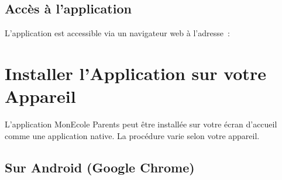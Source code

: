 \documentclass[12pt,a4paper]{report}
\begin{document}
\section{Acc\`es \`a l'application}

L'application est accessible via un navigateur web \`a l'adresse~:

\begin{center}
\end{center}

\newpage
\chapter{Installer l'Application sur votre Appareil}

L'application MonEcole Parents peut \^etre install\'ee sur votre \'ecran d'accueil comme une application native. La proc\'edure varie selon votre appareil.

\section{Sur Android (Google Chrome)}
\end{document}
